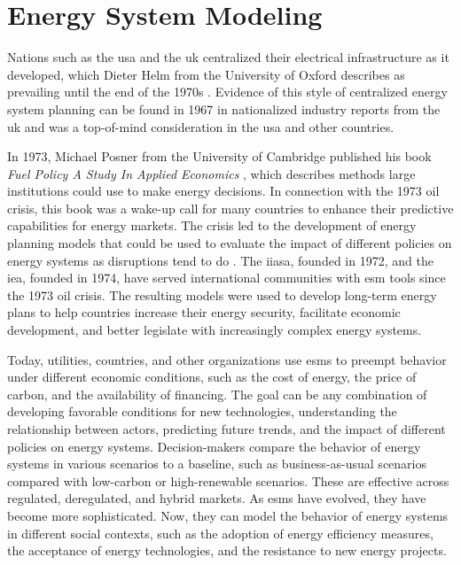 \section{Energy System Modeling}
\label{sec:esm}

Nations such as the \gls{usa} and the \gls{uk} centralized their electrical
infrastructure as it developed, which Dieter Helm from the University of Oxford
describes as prevailing until the end of the 1970s \cite{helm_energy_2002}.
Evidence of this style of centralized energy system planning can be found in
1967 in nationalized industry reports from the \gls{uk}
\cite{treasury_nationalised_1967} and was a top-of-mind consideration in the
\gls{usa} and other countries.

In 1973, Michael Posner from the University of Cambridge published his book
\textit{Fuel Policy A Study In Applied Economics} \cite{posner_fuel_1973},
which describes methods large institutions could use to make
energy decisions. In connection with the 1973 oil crisis, this book was a
wake-up call for many countries to enhance their predictive capabilities for
energy markets. The crisis led to the development of energy planning models
that could be used to evaluate the impact of different policies on energy
systems as disruptions tend to do \cite{plazas_disrupt_2022}. The \gls{iiasa},
founded in 1972, and the \gls{iea}, founded in 1974, have served international
communities with \gls{esm} tools since the 1973 oil crisis. The resulting
models were used to develop long-term energy plans to help countries increase
their energy security, facilitate economic development, and better legislate
with increasingly complex energy systems.

Today, utilities, countries, and other organizations use \glspl{esm} to preempt
behavior under different economic conditions, such as the cost of energy, the
price of carbon, and the availability of financing. The goal  can be any
combination of developing favorable conditions for new technologies,
understanding the relationship between actors, predicting future trends, and
the impact of different policies on energy systems. Decision-makers compare the
behavior of energy systems in various scenarios to a baseline, such as
business-as-usual scenarios compared with low-carbon or high-renewable
scenarios. These are effective across regulated, deregulated, and hybrid
markets. As \glspl{esm} have evolved, they have become more sophisticated. Now,
they can model the behavior of energy systems in different social contexts,
such as the adoption of energy efficiency measures, the acceptance of energy
technologies, and the resistance to new energy projects.

